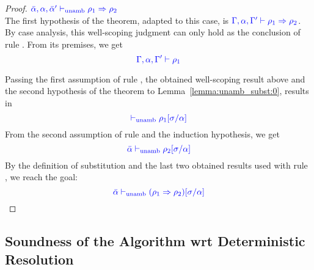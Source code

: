 \begin{proof}
\item[\fbox{\rref{UA-IAbs}}]\quad${\color{blue} \bar{\alpha},\alpha,\bar{\alpha}' \vdash_{\mathrm{unamb}} \rho_1\Rightarrow\rho_2}$\\
The first hypothesis of the theorem, adapted to this case, is ${\color{blue} \Gamma,\alpha,\Gamma' \vdash \rho_1\Rightarrow\rho_2}$.
By case analysis, this well-scoping judgment can only hold as the conclusion of rule . From its premises, we get
\begin{equation*}
{\color{blue} \Gamma,\alpha,\Gamma' \vdash\rho_1}
\end{equation*}

Passing the first assumption of rule , the obtained well-scoping result above and
the second hypothesis of the theorem to Lemma~\ref{lemma:unamb_subst:0}, results in
\begin{equation*}
{\color{blue}  \vdash_{\mathrm{unamb}}\rho_1[\sigma/\alpha]}
\end{equation*}
From the second assumption of rule  and the induction hypothesis, we get
\begin{equation*}
{\color{blue} \bar{\alpha} \vdash_{\mathrm{unamb}}\rho_2[\sigma/\alpha]}
\end{equation*}
By the definition of substitution and the last two obtained results used with rule
, we reach the goal:
\begin{equation*}
{\color{blue} \bar{\alpha} \vdash_{\mathrm{unamb}}(\rho_1\Rightarrow\rho_2)[\sigma/\alpha]}
\end{equation*}
\end{proof}
\subsection{Soundness of the Algorithm wrt Deterministic Resolution}



